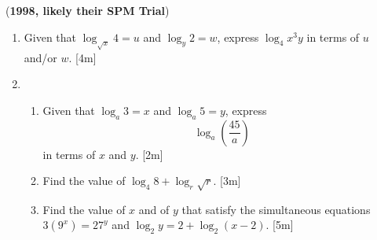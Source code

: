 \documentclass[notoc,notitlepage]{tufte-book}
\begin{document}
(\textbf{1998, likely their SPM Trial})
\begin{enumerate}
  \item Given that $\log_{\sqrt{x}} 4 = u$ and $\log_y 2 = w$, express $\log_4
    x^3 y$ in terms of $u$ and/or $w$. [4m]


  \item
    \begin{enumerate}
      \item Given that $\log_a 3 = x$ and $\log_a 5 = y$, express
        \begin{equation*}
          \log_a \left( \frac{45}{a} \right)
        \end{equation*}
        in terms of $x$ and $y$. [2m]
      \item Find the value of $\log_4 8 + \log_r \sqrt{r}$. [3m]
      \item Find the value of $x$ and of $y$ that satisfy the simultaneous
        equations $3(9^x) = 27^y$ and $\log_2 y = 2 + \log_2 (x - 2)$. [5m]
    \end{enumerate}
\end{enumerate}
\end{document}

